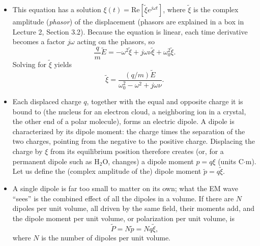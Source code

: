 \documentclass[11pt, oneside]{article}
\begin{document}
\begin{itemize}
\begin{equation}
		\quad\Rightarrow\quad
		\frac{q}{m}E(t) = \frac{d^2\xi}{dt^2} + \nu\frac{d\xi}{dt} + \omega_0^2 \xi,
	\end{equation}
	which is a damped harmonic oscillator.
	\item This equation has a solution $\xi(t) = \mathrm{Re}[\tilde{\xi}e^{j\omega t}]$, where $\tilde{\xi}$ is the complex amplitude (\emph{phasor}) of the displacement (phasors are explained in a box in Lecture 2, Section 3.2). Because the equation is linear, each time derivative becomes a factor $j\omega$ acting on the phasors, so
	\begin{equation}
		\frac{q}{m}\tilde{E} = -\omega^2 \tilde{\xi} + j\omega\nu \tilde{\xi} + \omega_0^2 \tilde{\xi}.
	\end{equation}
	Solving for $\tilde{\xi}$ yields
	\begin{equation}
		\label{e:displacement}
		\tilde{\xi} = \frac{(q/m)\tilde{E}}{\omega_0^2 - \omega^2 + j\omega\nu}.
	\end{equation}
	\item Each displaced charge $q$, together with the equal and opposite charge it is bound to (the nucleus for an electron cloud, a neighboring ion in a crystal, the other end of a polar molecule), forms an electric dipole. A dipole is characterized by its dipole moment: the charge times the separation of the two charges, pointing from the negative to the positive charge. Displacing the charge by $\xi$ from its equilibrium position therefore creates (or, for a permanent dipole such as H$_2$O, changes) a dipole moment $p = q\xi$ (units C$\cdot$m). Let us define the (complex amplitude of the) dipole moment $\tilde{p} = q\tilde{\xi}$.
	\item A single dipole is far too small to matter on its own; what the EM wave ``sees'' is the combined effect of all the dipoles in a volume. If there are $N$ dipoles per unit volume, all driven by the same field, their moments add, and the dipole moment per unit volume, or polarization per unit volume, is
	\begin{equation}
		\label{e:P}
		\tilde{P} = N\tilde{p} = Nq\tilde{\xi},
	\end{equation}
	where $N$ is the number of dipoles per unit volume.
	\begin{itemize}

\end{itemize}
\end{itemize}
\end{document}
